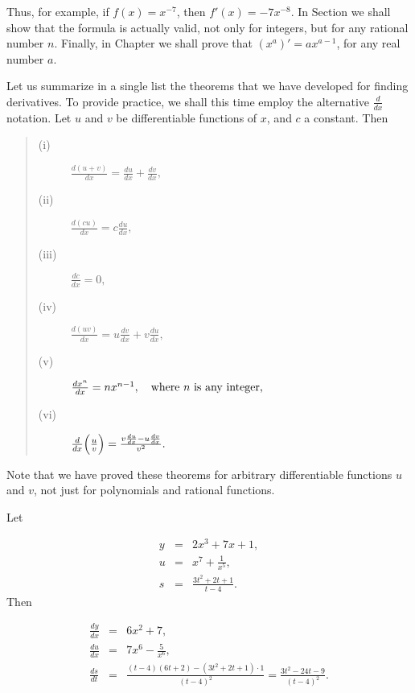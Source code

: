 Thus, for example, if $f(x) = x^{-7}$, then $f'(x) = - 7x^{-8}$. In Section  we shall show that the formula is actually valid, not only for integers, but for any rational number $n$. Finally, in Chapter  we shall prove that $(x^a)' = ax^{a-1}$, for any real number $a$.

Let us summarize in a single list the theorems that we have developed for finding derivatives. To provide practice, we shall this time employ the alternative $\frac{d}{dx}$ notation.  Let $u$ and $v$ be differentiable functions of $x$, and $ c$ a constant. Then

 
\begin{prop}
\label{thm ddxrules}

\begin{quote}
\begin{description}
\item[(i)] $\frac{d(u + v)}{dx} = \frac{du}{dx} + \frac{dv}{dx},$

\item[(ii)] $\frac{d(cu)}{dx} = c \frac{du}{dx},$

\item[(iii)] $\frac{dc}{dx}  = 0,$

\item[(iv)] $\frac {d(uv)}{dx}  = u \frac{dv}{dx} + v \frac{du}{dx},$

\item[(v)] $\frac{dx^n}{dx} = nx^{n-1}, \quad \mbox{where $n$ is any integer,}$ 


\item[(vi)] $\frac{d}{dx} \Bigl( \frac{u}{v} \Bigr) = \frac{v {\frac{du}{dx}} - u {\frac{dv}{dx}} }{v^2}.$
\end{description}
\end{quote}  
\end{prop}

Note that we have proved these theorems for arbitrary differentiable functions $u$ and $v$, not just for polynomials and rational functions.
\begin{example} Let

\begin{eqnarray*}
y &=& 2x^3+ 7x+ 1,          \\
u &=& x^7+ \frac{1}{x^5},   \\
s &=& \frac{3t^2 + 2t + 1}{t-4}.
\end{eqnarray*}
Then 

\begin{eqnarray*}
 \frac{dy}{dx} &=& 6x^2 + 7,            \\
 \frac{du}{dx} &=& 7x^6 - \frac{5}{x^6},\\
\frac{ds}{dt}  &=& \frac{ (t-4)(6t + 2) - (3t^2 + 2t + 1) \cdot 1}{(t-4)^2}
=\frac{3t^2 - 24t - 9}{(t-4)^2} .
\end{eqnarray*}
\end{example}

